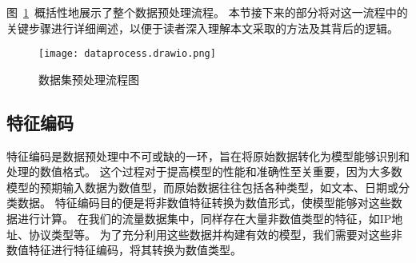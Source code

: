 图~\ref{fig:dataprocess}~概括性地展示了整个数据预处理流程。
本节接下来的部分将对这一流程中的关键步骤进行详细阐述，以便于读者深入理解本文采取的方法及其背后的逻辑。
\begin{figure}[htbp]
  \centering
  \texttt{[image: dataprocess.drawio.png]}
  \caption{数据集预处理流程图}
  \label{fig:dataprocess}
\end{figure}

\subsection{特征编码}

特征编码是数据预处理中不可或缺的一环，旨在将原始数据转化为模型能够识别和处理的数值格式。
这个过程对于提高模型的性能和准确性至关重要，因为大多数模型的预期输入数据为数值型，而原始数据往往包括各种类型，如文本、日期或分类数据。
特征编码目的便是将非数值特征转换为数值形式，使模型能够对这些数据进行计算。
在我们的流量数据集中，同样存在大量非数值类型的特征，如IP地址、协议类型等。
为了充分利用这些数据并构建有效的模型，我们需要对这些非数值特征进行特征编码，将其转换为数值类型。\par

